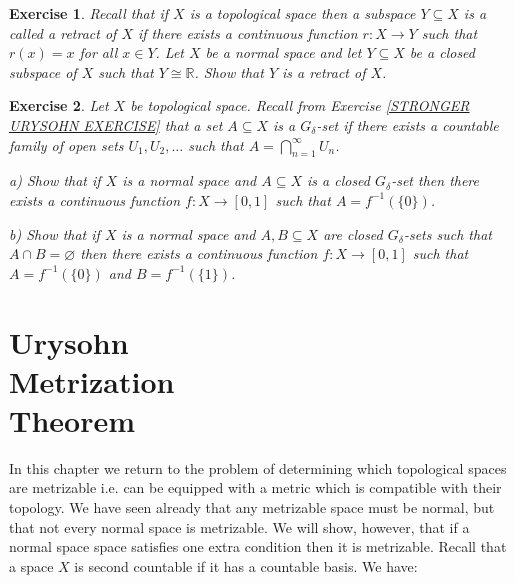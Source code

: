 \documentclass[11pt, letterpaper, oneside]{report}
\theoremstyle{pplain}
\newtheorem{ITERMVALUE THM}[theorem]{Intermediate Value Theorem}
\newtheorem{HEINEBOREL THM}[theorem]{Heine-Borel Theorem}
\newtheorem{UMETR THM}[theorem]{Urysohn Metrization Theorem}
\newtheorem{UMETR2 THM}[theorem]{Urysohn Metrization Theorem (v.2)}
\theoremstyle{ddefinition}
\theoremstyle{nnn}
\newtheorem{TDA NN}[theorem]{Topological Data Analysis. }
\theoremstyle{eexercise}
\newtheorem{exercise}{Exercise}[chapter]
\newcommand{\R}{{\mathbb R}}
\begin{document}
\begin{exercise}
Recall that if $X$ is a topological space  then a subspace $Y\subseteq X$ is a called a retract 
of $X$ if there exists a continuous function $r\colon X \to Y$ such that $r(x) = x$ for all $x\in Y$. 
Let $X$ be a normal space and let $Y\subseteq X$ be a closed subspace of $X$ such that 
$Y\cong \R$. Show that $Y$ is a retract of $X$. 
\end{exercise}




\begin{exercise}
\label{GDELTA URYSOHN FUNCTION EXERCISE}
Let $X$ be topological space. Recall from Exercise \ref{STRONGER URYSOHN EXERCISE} that 
a set $A\subseteq X$ is a $G_{\delta}$-set if there exists a countable family of open sets 
$U_{1}, U_{2}, \dots$ such that $A = \bigcap_{n=1}^{\infty} U_{n}$. 

a) Show that if $X$ is a normal space and $A\subseteq X$ is a closed $G_{\delta}$-set then 
there exists a continuous function $f\colon X\to [0, 1]$ such that $A = f^{-1}(\{0\})$.

b) Show that if $X$ is a normal space and $A, B \subseteq X$  are closed $G_{\delta}$-sets 
such that $A\cap B = \varnothing$ then there exists a continuous function $f\colon X\to [0, 1]$ 
such that $A = f^{-1}(\{0\})$ and $B = f^{-1}(\{1\})$.
\end{exercise}






\newpage

\chapter[Urysohn Metrization Theorem]{Urysohn \\ Metrization \\ Theorem}

\thispagestyle{firststyle}
  
  
  

In this chapter we  return to the problem of determining which topological spaces
are metrizable i.e. can be equipped with a metric which is compatible with their topology.  
We have seen already that any metrizable space must be normal, but that not every normal space is metrizable. 
We will show, however,  that if a normal space space satisfies one extra condition then it is  metrizable. 
Recall that a space $X$ is second countable if it has a countable basis. We have:
\end{document}
